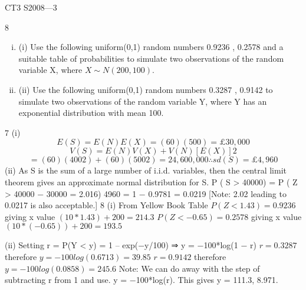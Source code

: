 \documentclass[a4paper,12pt]{article}
\begin{document}
CT3 S2008—3

8
\begin{enumerate}[(i)]
\item (i)
Use the following uniform(0,1) random numbers
0.9236 , 0.2578
and a suitable table of probabilities to simulate two observations of the random
variable X, where $X \sim N(200,100)$.
\item (ii)
Use the following uniform(0,1) random numbers
0.3287 , 0.9142
to simulate two observations of the random variable Y, where Y has an exponential distribution with mean 100.
\end{enumerate}

7
(i)
\[E ( S ) = E ( N ) E ( X ) = (60)(500) = £30, 000\]
\[V ( S ) = E ( N ) V ( X ) + V ( N )[ E ( X )] 2\]
\[= (60)(400 2 ) + (60)(500 2 ) = 24, 600, 000 ∴ sd ( S ) = £4,960\]
(ii)
As S is the sum of a large number of i.i.d. variables, then the central limit theorem gives an approximate normal distribution for S.
P ( S > 40000) = P ( Z >
40000 − 30000
= 2.016)
4960
= 1 − 0.9781 = 0.0219
[Note: 2.02 leading to 0.0217 is also acceptable.]
8
(i)
From Yellow Book Table
$P(Z < 1.43) = 0.9236$ giving x value $(10*1.43) + 200 = 214.3$
$P(Z < −0.65) = 0.2578$ giving x value $(10*(−0.65)) + 200 = 193.5$

(ii)
Setting r = P(Y < y) = 1 – exp(−y/100) ⇒ y = −100*log(1 − r)
$r = 0.3287$ therefore $y = −100log(0.6713) = 39.85$
$r = 0.9142$ therefore $y = −100log(0.0858) = 245.6$
Note: We can do away with the step of subtracting r from 1 and use.
y = −100*log(r). This gives y = 111.3, 8.971.
\end{document}
